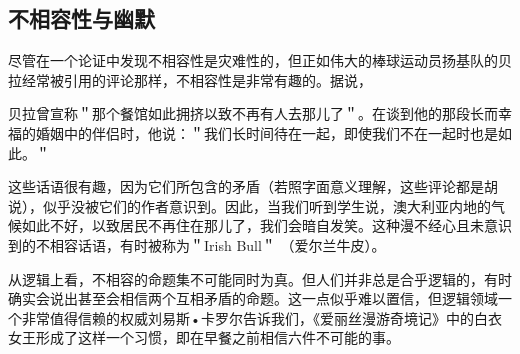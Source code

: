 \subsection{不相容性与幽默}

尽管在一个论证中发现不相容性是灾难性的，但正如伟大的棒球运动员扬基队的贝拉经常被引用的评论那样，不相容性是非常有趣的。据说，

贝拉曾宣称＂那个餐馆如此拥挤以致不再有人去那儿了＂。在谈到他的那段长而幸福的婚姻中的伴侣时，他说：＂我们长时间待在一起，即使我们不在一起时也是如此。＂

这些话语很有趣，因为它们所包含的矛盾（若照字面意义理解，这些评论都是胡说），似乎没被它们的作者意识到。因此，当我们听到学生说，澳大利亚内地的气候如此不好，以致居民不再住在那儿了，我们会暗自发笑。这种漫不经心且未意识到的不相容话语，有时被称为＂Irish Bull＂ （爱尔兰牛皮）。

从逻辑上看，不相容的命题集不可能同时为真。但人们并非总是合乎逻辑的，有时确实会说出甚至会相信两个互相矛盾的命题。这一点似乎难以置信，但逻辑领域一个非常值得信赖的权威刘易斯•卡罗尔告诉我们，《爱丽丝漫游奇境记》中的白衣女王形成了这样一个习惯，即在早餐之前相信六件不可能的事。

\begin{center}
\end{center}